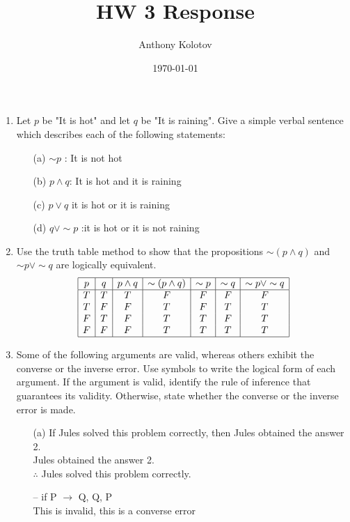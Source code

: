 \documentclass{article}
\title{HW 3 Response}
\author{Anthony Kolotov}
\date{\today}
\begin{document}
	
	\maketitle
	
	\begin{enumerate}
		\item Let $p$ be "It is hot" and let $q$ be "It is raining". Give a simple verbal sentence which describes each of the following statements:
		\begin{itemize}
			\item[(a)] $\sim p$ : It is not hot
			\item[(b)] $p \land q$: It is hot and it is raining
			\item[(c)] $p \lor q$ it is hot or it is raining
			\item[(d)] $q \lor \sim p$ :it is hot or it is not raining
		\end{itemize}
		
		\item Use the truth table method to show that the propositions $\sim (p \land q)$ and $\sim p \lor \sim q$ are logically equivalent.
		\[
		\begin{array}{|c|c|c|c|c|c|c|}
		\hline
		p & q & p \land q & \sim (p \land q) & \sim p & \sim q & \sim p \lor \sim q \\
		\hline
		T & T & T & F & F & F & F \\
		T & F & F & T & F & T & T \\
		F & T & F & T & T & F & T \\
		F & F & F & T & T & T & T \\ 
		\hline
		\end{array}
		\]
		
		\item Some of the following arguments are valid, whereas others exhibit the converse or the inverse error. Use symbols to write the logical form of each argument. If the argument is valid, identify the rule of inference that guarantees its validity. Otherwise, state whether the converse or the inverse error is made.
		\begin{itemize}
			\item[(a)] If Jules solved this problem correctly, then Jules obtained the answer 2.\\
			Jules obtained the answer 2.\\
			$\therefore$ Jules solved this problem correctly.
			\item[--] if P $\rightarrow$ Q, Q, P \\ 
			This is invalid, this is a converse error
			

\end{itemize}
\end{enumerate}
\end{document}
